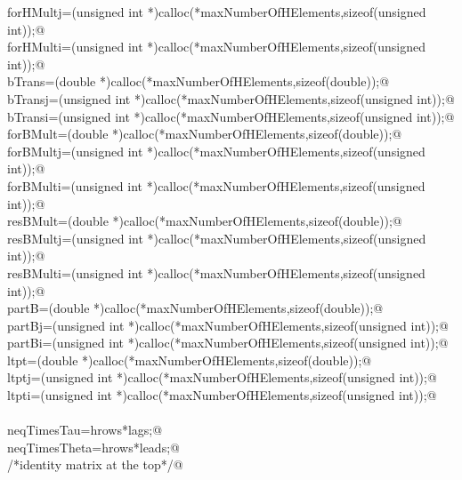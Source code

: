 \documentclass[12pt]{article}
\begin{document}
\begin{flushleft}
\begin{minipage}{\linewidth}
\begin{list}{}{}
\mbox{}\verb@        forHMultj=(unsigned int *)calloc(*maxNumberOfHElements,sizeof(unsigned int));@\\
\mbox{}\verb@        forHMulti=(unsigned int *)calloc(*maxNumberOfHElements,sizeof(unsigned int));@\\
\mbox{}\verb@        bTrans=(double *)calloc(*maxNumberOfHElements,sizeof(double));@\\
\mbox{}\verb@        bTransj=(unsigned int *)calloc(*maxNumberOfHElements,sizeof(unsigned int));@\\
\mbox{}\verb@        bTransi=(unsigned int *)calloc(*maxNumberOfHElements,sizeof(unsigned int));@\\
\mbox{}\verb@        forBMult=(double *)calloc(*maxNumberOfHElements,sizeof(double));@\\
\mbox{}\verb@        forBMultj=(unsigned int *)calloc(*maxNumberOfHElements,sizeof(unsigned int));@\\
\mbox{}\verb@        forBMulti=(unsigned int *)calloc(*maxNumberOfHElements,sizeof(unsigned int));@\\
\mbox{}\verb@        resBMult=(double *)calloc(*maxNumberOfHElements,sizeof(double));@\\
\mbox{}\verb@        resBMultj=(unsigned int *)calloc(*maxNumberOfHElements,sizeof(unsigned int));@\\
\mbox{}\verb@        resBMulti=(unsigned int *)calloc(*maxNumberOfHElements,sizeof(unsigned int));@\\
\mbox{}\verb@        partB=(double *)calloc(*maxNumberOfHElements,sizeof(double));@\\
\mbox{}\verb@        partBj=(unsigned int *)calloc(*maxNumberOfHElements,sizeof(unsigned int));@\\
\mbox{}\verb@        partBi=(unsigned int *)calloc(*maxNumberOfHElements,sizeof(unsigned int));@\\
\mbox{}\verb@        ltpt=(double *)calloc(*maxNumberOfHElements,sizeof(double));@\\
\mbox{}\verb@        ltptj=(unsigned int *)calloc(*maxNumberOfHElements,sizeof(unsigned int));@\\
\mbox{}\verb@        ltpti=(unsigned int *)calloc(*maxNumberOfHElements,sizeof(unsigned int));@\\
\mbox{}\verb@@\\
\mbox{}\verb@        neqTimesTau=hrows*lags;@\\
\mbox{}\verb@        neqTimesTheta=hrows*leads;@\\
\mbox{}\verb@        /*identity matrix at the top*/@\\

\end{list}
\end{minipage}
\end{flushleft}
\end{document}
